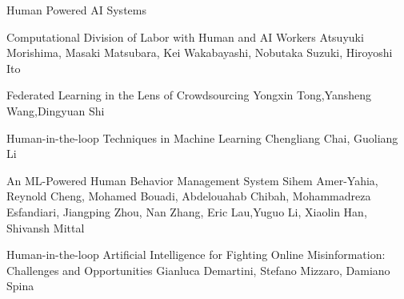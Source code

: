 \documentclass[11pt]{article}
\begin{document}
\begin{bulletin}
\begin{articlesection}{Human Powered AI Systems}
\begin{article}
	{Computational Division of Labor with Human and AI Workers}
	{Atsuyuki Morishima,
	Masaki Matsubara,
	Kei Wakabayashi,
	Nobutaka Suzuki,
	Hiroyoshi Ito}

	
\end{article}

\begin{article}
	{Federated Learning in the Lens of Crowdsourcing}
	{Yongxin Tong,Yansheng Wang,Dingyuan Shi
	}
	
\end{article}

\begin{article}
	{Human-in-the-loop Techniques in Machine Learning}
	{Chengliang Chai, Guoliang Li}
	
\end{article}

\begin{article}
		{An ML-Powered Human Behavior Management System}
		{Sihem Amer-Yahia, Reynold Cheng, Mohamed Bouadi,
			Abdelouahab Chibah, Mohammadreza Esfandiari, 
			Jiangping Zhou, Nan Zhang, Eric Lau,Yuguo Li,
			Xiaolin Han, Shivansh Mittal
		}
		
\end{article}
\begin{article}
	{Human-in-the-loop Artificial Intelligence for Fighting Online Misinformation: Challenges and Opportunities}
	{Gianluca Demartini, Stefano Mizzaro, Damiano Spina}
	
\end{article}




\end{articlesection}


\end{bulletin}
\end{document}
